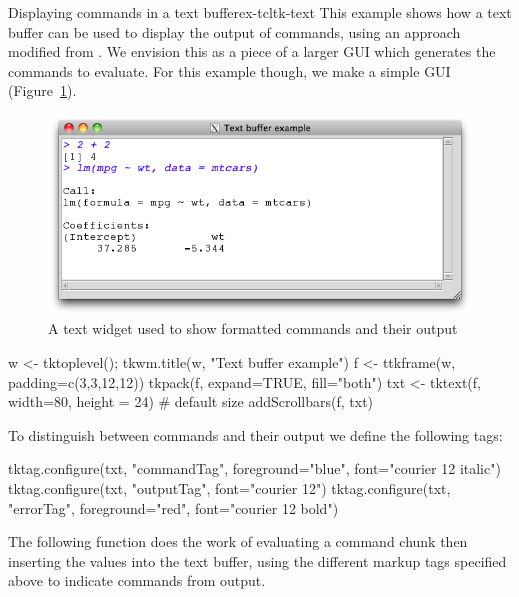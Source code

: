 \begin{example}{Displaying commands in a text buffer}{ex-tcltk-text}
This example shows how a text buffer can be used to display the output
of \R\/ commands, using an approach modified from .  We
envision this as a piece of a larger GUI which generates the commands
to evaluate. For this example though, we make a simple GUI
(Figure~\ref{fig:tcltk-text-buffer-commands}).

\begin{figure}
  \centering
  \includegraphics[width=.8\textwidth]{fig-tcltk-text-buffer-commands.png}
  \caption{A text widget used to show formatted \R{} commands and their output}
  \label{fig:tcltk-text-buffer-commands}
\end{figure}

\begin{Schunk}
\begin{Sinput}
 w <- tktoplevel(); tkwm.title(w, "Text buffer example")
 f <- ttkframe(w, padding=c(3,3,12,12))
 tkpack(f, expand=TRUE, fill="both")
 txt <- tktext(f, width=80, height = 24)   # default size
 addScrollbars(f, txt)
\end{Sinput}
\end{Schunk}
 
To distinguish between commands and their output we define the
following tags:
\begin{Schunk}
\begin{Sinput}
 tktag.configure(txt, "commandTag", foreground="blue", 
                 font="courier 12 italic")
 tktag.configure(txt, "outputTag", font="courier 12")
 tktag.configure(txt, "errorTag", foreground="red", 
                 font="courier 12 bold")
\end{Sinput}
\end{Schunk}

The following function does the work of evaluating a command chunk
then inserting the values into the text buffer, using the different
markup tags specified above to indicate commands from output.


\end{example}
